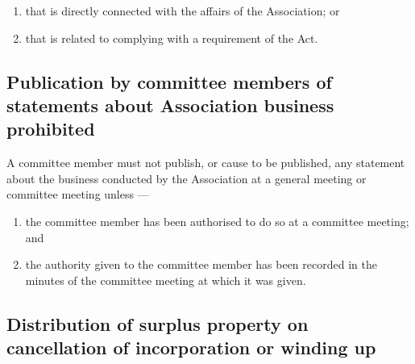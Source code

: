 \documentclass[../constitution.tex]{subfiles}
\begin{document}
\begin{enumerate}
        \begin{enumerate}

          \item that is directly connected with the affairs of the Association; or
          \item that is related to complying with a requirement of the Act.
        \end{enumerate}


\end{enumerate}

\hypertarget{publication-by-committee-members-of-statements-about-association-business-prohibited}{%
  \subsection{Publication by committee members of statements about Association business prohibited}\label{publication-by-committee-members-of-statements-about-association-business-prohibited}}

A committee member must not publish, or cause to be published, any statement about the business conducted by the Association at a general meeting or committee meeting unless ---

\begin{enumerate}

  \item the committee member has been authorised to do so at a committee meeting; and
  \item the authority given to the committee member has been recorded in the minutes of the committee meeting at which it was given.
\end{enumerate}


\hypertarget{distribution-of-surplus-property-on-cancellation-of-incorporation-or-winding-up}{%
  \subsection{Distribution of surplus property on cancellation of incorporation or winding up}\label{distribution-of-surplus-property-on-cancellation-of-incorporation-or-winding-up}}
\end{document}
